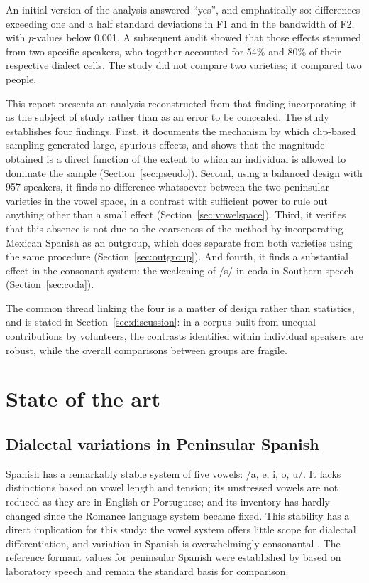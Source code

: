 \documentclass[11pt]{article}
\begin{document}
An initial version of the analysis answered ``yes'', and emphatically so:
differences exceeding one and a half standard deviations in F1 and in the
bandwidth of F2, with $p$-values below 0.001. A subsequent audit showed that
those effects stemmed from two specific speakers, who together accounted for
54\% and 80\% of their respective dialect cells. The study did not compare two
varieties; it compared two people.

This report presents an analysis reconstructed from that finding incorporating it
as the subject of study rather than as an error to be concealed. The study
establishes four findings. First, it documents the mechanism by which clip-based
sampling generated large, spurious effects, and shows that the magnitude obtained
is a direct function of the extent to which an individual is allowed to dominate
the sample (Section~\ref{sec:pseudo}). Second, using a balanced design with 957
speakers, it finds no difference whatsoever between the two peninsular varieties
in the vowel space, in a contrast with sufficient power to rule out anything
other than a small effect (Section~\ref{sec:vowelspace}). Third, it verifies that
this absence is not due to the coarseness of the method by incorporating Mexican
Spanish as an outgroup, which does separate from both varieties using the same
procedure (Section~\ref{sec:outgroup}). And fourth, it finds a substantial effect
in the consonant system: the weakening of /s/ in coda in Southern speech
(Section~\ref{sec:coda}).

The common thread linking the four is a matter of design rather than statistics,
and is stated in Section~\ref{sec:discussion}: in a corpus built from unequal
contributions by volunteers, the contrasts identified within individual speakers
are robust, while the overall comparisons between groups are fragile.

\section{State of the art}

\subsection{Dialectal variations in Peninsular Spanish}
\label{sec:dialectal}

Spanish has a remarkably stable system of five vowels: /a, e, i, o, u/. It lacks
distinctions based on vowel length and tension; its unstressed vowels are not
reduced as they are in English or Portuguese; and its inventory has hardly
changed since the Romance language system became fixed. This stability has a
direct implication for this study: the vowel system offers little scope for
dialectal differentiation, and variation in Spanish is overwhelmingly consonantal
\citep{hualde2005,martinez2007}. The reference formant values for peninsular
Spanish were established by \citet{quilis1981} based on laboratory speech and
remain the standard basis for comparison.
\end{document}
